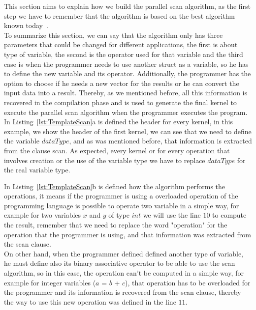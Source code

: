 \documentclass[Ingles]{ic-tese-v1}
\newcommand{\rlst}[1]{Listing~\ref{lst:#1}}
\begin{document}
This section aims to explain how we build the parallel scan algorithm, as
the first step we have to remember that the algorithm is based on the best
algorithm known today~\cite{Sengupta:2007}.\\
To summarize this section, we can say that the algorithm only has three parameters that could be changed for different applications, the first is about type of variable, the second is the operator used for that variable and the third case is when the programmer needs to use another struct as a variable, so he has to define the new variable and its operator. Additionally, the programmer has the option to choose if he needs a new vector for the results or he can convert the input data into a result. Thereby, as we mentioned before, all this information is recovered in the compilation phase and is used to generate the final kernel to execute the parallel scan algorithm when the programmer executes the program.\\
In \rlst{TemplateScan}{a} is defined the header for every kernel, in this example, we show the header of the first kernel, we can see that we need to define the variable $dataType$, and as was mentioned before, that information is extracted from the clause scan. As expected, every kernel or for every operation that involves creation or the use of the variable type we have to replace $dataType$ for the real variable type.

In \rlst{TemplateScan}{b} is defined how the algorithm performs the operations, it means if the programmer is using a overloaded operation of the programming language is possible to operate two variable in a simple way, for example for two variables $x$ and $y$ of type $int$ we will use the line $10$ to compute the result, remember that we need to replace the word "operation" for the operation that the programmer is using, and that information was extracted from the scan clause.\\On other hand, when the programmer defined defined another type of variable, he must define also its binary associative operator to be able to use the scan algorithm, so in this case, the operation can't be computed in a simple way, for example for integer variables ($a$ = $b$ + $c$), that operation has to be overloaded for the programmer and its information is recovered from the scan clause, thereby the way to use this new operation was defined in the line $11$.
\end{document}

